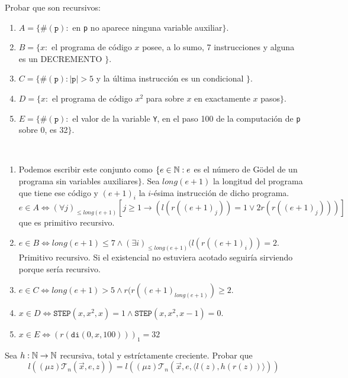\documentclass[twoside]{article}
\begin{document}
\newpage
\begin{ejercicio}{6}
Probar que son recursivos:
\begin{enumerate}
\item $A = \{\#(\texttt{p}) :$ en \texttt{p} no aparece ninguna variable auxiliar$\}$.
\item $B = \{x :$ el programa de código $x$ posee, a lo sumo, 7 instrucciones y alguna es un DECREMENTO $\}$.
\item $C = \{\#(\texttt{p}) : |\texttt{p}| > 5$ y la última instrucción es un condicional $\}$.
\item $D = \{x :$ el programa de código $x^2$ para sobre $x$ en exactamente $x$ pasos$\}$.
\item $E = \{\#(\texttt{p}) :$ el valor de la variable \texttt{Y}, en el paso 100 de la computación de \texttt{p} sobre 0, es 32$\}$.
\end{enumerate}
\end{ejercicio}
\begin{solucion}\
\begin{enumerate}
\item Podemos escribir este conjunto como $\{e\in\mathbb{N}: e$ es el número de Gödel de un programa sin variables auxiliares$\}$. Sea $long(e+1)$ la longitud del programa que tiene ese código y $(e+1)_i$ la $i$-ésima instrucción de dicho programa. $e\in A\Leftrightarrow(\forall j)_{\leq long(e+1)}[j\geq 1\rightarrow (l(r((e+1)_j))=1\lor 2r(r((e+1)_j)))]$ que es primitivo recursivo.
\item $e\in B\Leftrightarrow long(e+1)\leq 7 \land (\exists i)_{\leq long(e+1)}(l(r((e+1)_i))=2$. Primitivo recursivo. Si el existencial no estuviera acotado seguiría sirviendo porque sería recursivo.
\item $e\in C\Leftrightarrow long(e+1)>5\land r(r((e+1)_{long(e+1)})\geq 2$.
\item $x\in D\Leftrightarrow \texttt{STEP}(x,x^2,x)=1\land \texttt{STEP}(x,x^2,x-1)=0$. 
\item $x\in E\Leftrightarrow (r(\texttt{di}(0,x,100)))_1=32$
\end{enumerate}
\end{solucion}
\newpage

\begin{ejercicio}{7}
Sea $h : \mathbb{N} \to \mathbb{N}$ recursiva, total y estríctamente creciente. Probar que
\[ l((μ z) \mathcal{T}_n(\vec{x},e,z)) = l((μ z) \mathcal{T}_n (\vec{x},e, \langle l(z),h(r(z))\rangle ))\]
\end{ejercicio}
\begin{solucion}
\end{solucion}
\end{document}
